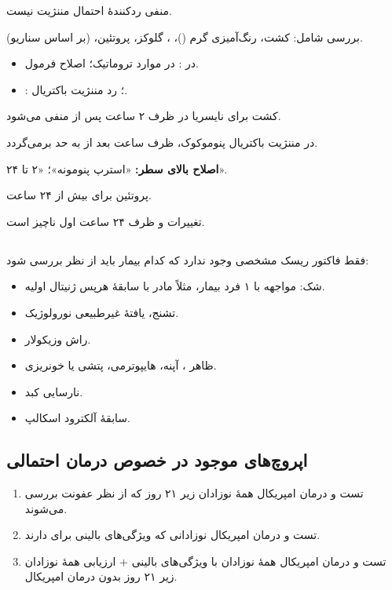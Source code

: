 \documentclass[12pt,a4paper]{article}
\begin{document}
 منفی ردکنندهٔ احتمال مننژیت نیست.

بررسی  شامل: کشت، رنگ‌آمیزی گرم ()، ، گلوکز، پروتئین،  (بر اساس سناریو).

\begin{itemize}
\item {} در :  در موارد تروماتیک؛ اصلاح فرمول.
\item {}: ؛ رد مننژیت باکتریال.
\end{itemize}

کشت برای نایسریا در  ظرف ۲ ساعت پس از  منفی می‌شود.

در مننژیت باکتریال پنوموکوک،  ظرف  ساعت بعد از  به حد  برمی‌گردد.

\textbf{اصلاح بالای سطر:} «استرپ پنومونه»؛ «۲ تا ۲۴».

پروتئین  برای بیش از ۲۴ ساعت.

تغییرات  و  ظرف ۲۴ ساعت اول ناچیز است.

\subsection*{}
فقط فاکتور ریسک مشخصی وجود ندارد که کدام بیمار باید از نظر  بررسی شود:
\begin{itemize}
\item شک: مواجهه با ۱ فرد بیمار، مثلاً مادر با سابقهٔ هرپس ژنیتال اولیه.
\item تشنج، یافتهٔ غیرطبیعی نورولوژیک.
\item راش وزیکولار.
\item ظاهر ، آپنه، هایپوترمی، پتشی یا خونریزی.
\item نارسایی کبد.
\item سابقهٔ آلکترود اسکالپ.
\end{itemize}

\subsection*{اپروچ‌های موجود در خصوص درمان  احتمالی}
\begin{enumerate}
\item تست و درمان امپریکال همهٔ نوزادان زیر ۲۱ روز که از نظر عفونت بررسی می‌شوند.
\item تست و درمان امپریکال نوزادانی که ویژگی‌های بالینی  برای  دارند.
\item تست و درمان امپریکال همهٔ نوزادان با ویژگی‌های بالینی 
  + ارزیابی  همهٔ نوزادان زیر ۲۱ روز بدون درمان امپریکال.
\end{enumerate}
\end{document}
